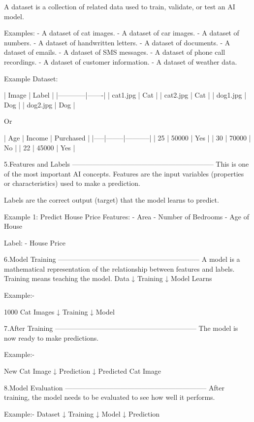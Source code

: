 A dataset is a collection of related data used to train, validate, or test an AI model.

Examples:
- A dataset of cat images.
- A dataset of car images.
- A dataset of numbers.
- A dataset of handwritten letters.
- A dataset of documents.
- A dataset of emails.
- A dataset of SMS messages.
- A dataset of phone call recordings.
- A dataset of customer information.
- A dataset of weather data.

Example Dataset:

| Image      | Label |
|------------|-------|
| cat1.jpg   | Cat   |
| cat2.jpg   | Cat   |
| dog1.jpg   | Dog   |
| dog2.jpg   | Dog   |

Or

| Age | Income | Purchased |
|-----|--------|-----------|
| 25  | 50000  | Yes       |
| 30  | 70000  | No        |
| 22  | 45000  | Yes       |



5.Features and Labels --------------------------------------------------------------
This is one of the most important AI concepts.
Features are the input variables (properties or characteristics) used to make a prediction.

Labels are the correct output (target) that the model learns to predict.

Example 1: Predict House Price
Features:
- Area
- Number of Bedrooms
- Age of House

Label:
- House Price



6.Model Training --------------------------------------------------------------
A model is a mathematical representation of the relationship between features and labels.
Training means teaching the model.
Data
   ↓
Training
   ↓
Model Learns

Example:-

1000 Cat Images
  ↓
Training
  ↓
Model

7.After Training --------------------------------------------------------------
The model is now ready to make predictions.

Example:-

New Cat Image
  ↓
Prediction
  ↓
Predicted Cat Image


8.Model Evaluation --------------------------------------------------------------
After training, the model needs to be evaluated to see how well it performs.

Example:-
Dataset
      ↓
Training
      ↓
Model
      ↓
Prediction






